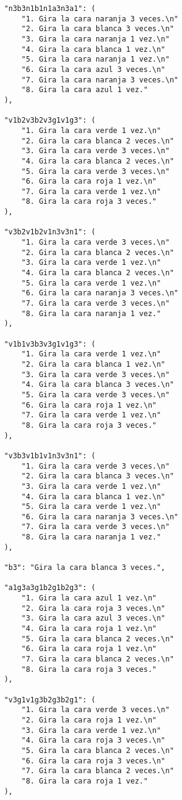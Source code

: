 \begin{lstlisting}
    "n3b3n1b1n1a3n3a1": (
        "1. Gira la cara naranja 3 veces.\n"
        "2. Gira la cara blanca 3 veces.\n"
        "3. Gira la cara naranja 1 vez.\n"
        "4. Gira la cara blanca 1 vez.\n"
        "5. Gira la cara naranja 1 vez.\n"
        "6. Gira la cara azul 3 veces.\n"
        "7. Gira la cara naranja 3 veces.\n"
        "8. Gira la cara azul 1 vez."
    ),
    
    "v1b2v3b2v3g1v1g3": (
        "1. Gira la cara verde 1 vez.\n"
        "2. Gira la cara blanca 2 veces.\n"
        "3. Gira la cara verde 3 veces.\n"
        "4. Gira la cara blanca 2 veces.\n"
        "5. Gira la cara verde 3 veces.\n"
        "6. Gira la cara roja 1 vez.\n"
        "7. Gira la cara verde 1 vez.\n"
        "8. Gira la cara roja 3 veces."
    ),
    
    "v3b2v1b2v1n3v3n1": (
        "1. Gira la cara verde 3 veces.\n"
        "2. Gira la cara blanca 2 veces.\n"
        "3. Gira la cara verde 1 vez.\n"
        "4. Gira la cara blanca 2 veces.\n"
        "5. Gira la cara verde 1 vez.\n"
        "6. Gira la cara naranja 3 veces.\n"
        "7. Gira la cara verde 3 veces.\n"
        "8. Gira la cara naranja 1 vez."
    ),
    
    "v1b1v3b3v3g1v1g3": (
        "1. Gira la cara verde 1 vez.\n"
        "2. Gira la cara blanca 1 vez.\n"
        "3. Gira la cara verde 3 veces.\n"
        "4. Gira la cara blanca 3 veces.\n"
        "5. Gira la cara verde 3 veces.\n"
        "6. Gira la cara roja 1 vez.\n"
        "7. Gira la cara verde 1 vez.\n"
        "8. Gira la cara roja 3 veces."
    ),
    
    "v3b3v1b1v1n3v3n1": (
        "1. Gira la cara verde 3 veces.\n"
        "2. Gira la cara blanca 3 veces.\n"
        "3. Gira la cara verde 1 vez.\n"
        "4. Gira la cara blanca 1 vez.\n"
        "5. Gira la cara verde 1 vez.\n"
        "6. Gira la cara naranja 3 veces.\n"
        "7. Gira la cara verde 3 veces.\n"
        "8. Gira la cara naranja 1 vez."
    ),
    
    "b3": "Gira la cara blanca 3 veces.",
    
    "a1g3a3g1b2g1b2g3": (
        "1. Gira la cara azul 1 vez.\n"
        "2. Gira la cara roja 3 veces.\n"
        "3. Gira la cara azul 3 veces.\n"
        "4. Gira la cara roja 1 vez.\n"
        "5. Gira la cara blanca 2 veces.\n"
        "6. Gira la cara roja 1 vez.\n"
        "7. Gira la cara blanca 2 veces.\n"
        "8. Gira la cara roja 3 veces."
    ),
    
    "v3g1v1g3b2g3b2g1": (
        "1. Gira la cara verde 3 veces.\n"
        "2. Gira la cara roja 1 vez.\n"
        "3. Gira la cara verde 1 vez.\n"
        "4. Gira la cara roja 3 veces.\n"
        "5. Gira la cara blanca 2 veces.\n"
        "6. Gira la cara roja 3 veces.\n"
        "7. Gira la cara blanca 2 veces.\n"
        "8. Gira la cara roja 1 vez."
    ),
    

\end{lstlisting}
